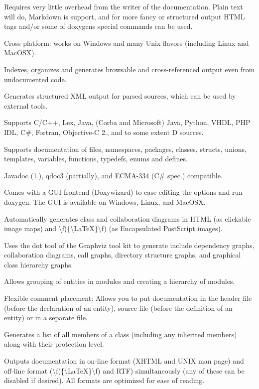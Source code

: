 \begin{DoxyItemize}
\item Requires very little overhead from the writer of the documentation. Plain text will do, Markdown is support, and for more fancy or structured output H\+T\+ML tags and/or some of doxygen\textquotesingle{}s special commands can be used. 
\item Cross platform\+: works on Windows and many Unix flavors (including Linux and Mac\+O\+SX). 
\item Indexes, organizes and generates browsable and cross-\/referenced output even from undocumented code. 
\item Generates structured X\+ML output for parsed sources, which can be used by external tools. 
\item Supports C/\+C++, Lex, Java, (Corba and Microsoft) Java, Python, V\+H\+DL, P\+HP I\+DL, C\#, Fortran, Objective-\/C 2., and to some extent D sources. 
\item Supports documentation of files, namespaces, packages, classes, structs, unions, templates, variables, functions, typedefs, enums and defines. 
\item Javadoc (1.), qdoc3 (partially), and E\+C\+M\+A-\/334 (C\# spec.) compatible. 
\item Comes with a G\+UI frontend (Doxywizard) to ease editing the options and run doxygen. The G\+UI is available on Windows, Linux, and Mac\+O\+SX. 
\item Automatically generates class and collaboration diagrams in H\+T\+ML (as clickable image maps) and \textbackslash{}f(\{\textbackslash{}\+La\+TeX\}\textbackslash{}f) (as Encapsulated Post\+Script images). 
\item Uses the {\ttfamily dot} tool of the Graphviz tool kit to generate include dependency graphs, collaboration diagrams, call graphs, directory structure graphs, and graphical class hierarchy graphs. 
\item Allows grouping of entities in modules and creating a hierarchy of modules. 
\item Flexible comment placement\+: Allows you to put documentation in the header file (before the declaration of an entity), source file (before the definition of an entity) or in a separate file. 
\item Generates a list of all members of a class (including any inherited members) along with their protection level. 
\item Outputs documentation in on-\/line format (X\+H\+T\+ML and U\+N\+IX man page) and off-\/line format (\textbackslash{}f(\{\textbackslash{}\+La\+TeX\}\textbackslash{}f) and R\+TF) simultaneously (any of these can be disabled if desired). All formats are optimized for ease of reading. ~\newline

\end{DoxyItemize}
